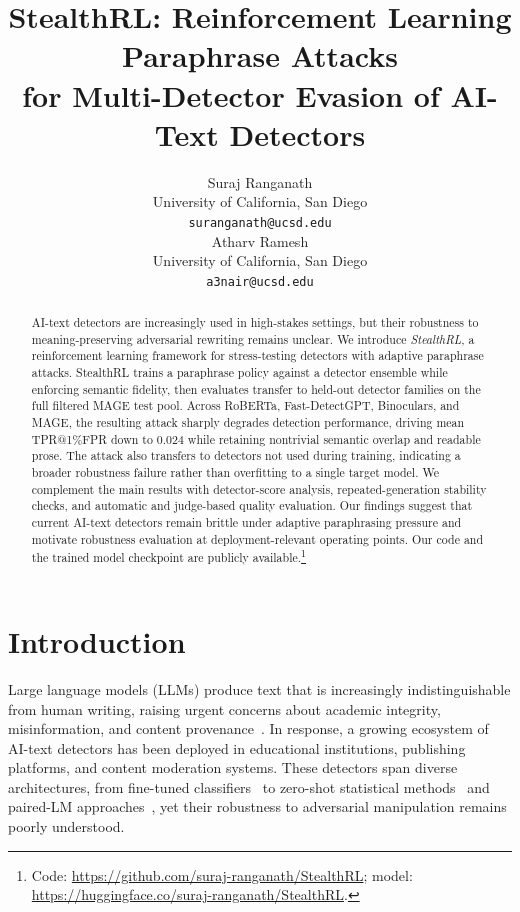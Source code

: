 \documentclass[11pt]{article}
\title{StealthRL: Reinforcement Learning Paraphrase Attacks\\for Multi-Detector Evasion of AI-Text Detectors}
\author{
  Suraj Ranganath \\
  University of California, San Diego \\
  \texttt{suranganath@ucsd.edu} \\\And
  Atharv Ramesh \\
  University of California, San Diego \\
  \texttt{a3nair@ucsd.edu}
}
\date{}
\begin{document}
\maketitle

\begin{abstract}
AI-text detectors are increasingly used in high-stakes settings, but their robustness to meaning-preserving adversarial rewriting remains unclear. We introduce \emph{StealthRL}, a reinforcement learning framework for stress-testing detectors with adaptive paraphrase attacks. StealthRL trains a paraphrase policy against a detector ensemble while enforcing semantic fidelity, then evaluates transfer to held-out detector families on the full filtered MAGE test pool. Across RoBERTa, Fast-DetectGPT, Binoculars, and MAGE, the resulting attack sharply degrades detection performance, driving mean TPR@1\%FPR down to 0.024 while retaining nontrivial semantic overlap and readable prose. The attack also transfers to detectors not used during training, indicating a broader robustness failure rather than overfitting to a single target model. We complement the main results with detector-score analysis, repeated-generation stability checks, and automatic and judge-based quality evaluation. Our findings suggest that current AI-text detectors remain brittle under adaptive paraphrasing pressure and motivate robustness evaluation at deployment-relevant operating points. Our code and the trained model checkpoint are publicly available.\footnote{Code: \url{https://github.com/suraj-ranganath/StealthRL}; model: \url{https://huggingface.co/suraj-ranganath/StealthRL}.}
\end{abstract}

\section{Introduction}
\label{sec:intro}

Large language models (LLMs) produce text that is increasingly indistinguishable from human writing, raising urgent concerns about academic integrity, misinformation, and content provenance~\cite{solaiman2019release}. In response, a growing ecosystem of AI-text detectors has been deployed in educational institutions, publishing platforms, and content moderation systems. These detectors span diverse architectures, from fine-tuned classifiers~\cite{solaiman2019release} to zero-shot statistical methods~\cite{mitchell2023detectgptzeroshotmachinegeneratedtext, bao2024fastdetectgptefficientzeroshotdetection} and paired-LM approaches~\cite{hans2024spottingllmsbinocularszeroshot}, yet their robustness to adversarial manipulation remains poorly understood.
\end{document}
